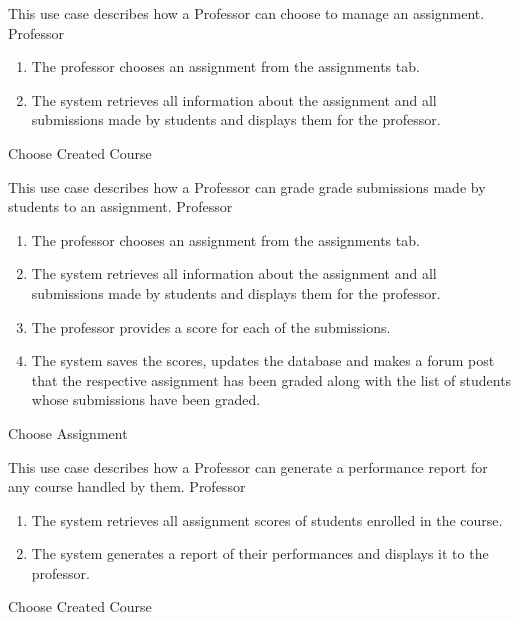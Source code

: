 \documentclass[12pt, a4]{report}
\begin{document}

\newpage
{}
{ %
This use case describes how a Professor can choose to manage an assignment.
}
{ %
Professor
}
{ %
\begin{enumerate}
    \item The professor chooses an assignment from the assignments tab.
    \item The system retrieves all information about the assignment and all submissions made by students and displays them for the professor.
\end{enumerate}
}
{ %
}
{ %
}
{ %
}
{ %
Choose Created Course
}
{ %
}


{ %
This use case describes how a Professor can grade grade submissions made by students to an assignment.
}
{ %
Professor
}
{ %
\begin{enumerate}
    \item The professor chooses an assignment from the assignments tab.
    \item The system retrieves all information about the assignment and all submissions made by students and displays them for the professor.
    \item The professor provides a score for each of the submissions.
    \item The system saves the scores, updates the database and makes a forum post that the respective assignment has been graded along with the list of students whose submissions have been graded.
\end{enumerate}
}
{ %
}
{ %
}
{ %
}
{ %
Choose Assignment
}
{ %
}


\newpage
{}
{ %
This use case describes how a Professor can generate a performance report for any course handled by them.
}
{ %
Professor
}
{ %
\begin{enumerate}
    \item The system retrieves all assignment scores of students enrolled in the course.
    \item The system generates a report of their performances and displays it to the professor.
\end{enumerate}
}
{ %
}
{ %
}
{ %
}
{ %
Choose Created Course
}
{ %
}

\end{document}
